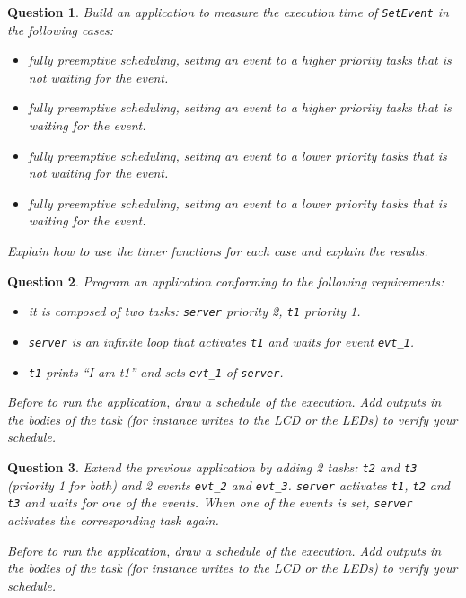 \documentclass[11pt]{report}
\newtheorem{ex}{Question}
\begin{document}
\begin{ex}
    Build an application to measure the execution time of \texttt{SetEvent} in the following cases:
    \begin{itemize}
        \item fully preemptive scheduling, setting an event to a higher priority tasks that is not waiting for the event.
        \item fully preemptive scheduling, setting an event to a higher priority tasks that is waiting for the event.
        \item fully preemptive scheduling, setting an event to a lower priority tasks that is not waiting for the event.
        \item fully preemptive scheduling, setting an event to a lower priority tasks that is waiting for the event.
    \end{itemize}

    Explain how to use the timer functions for each case and explain the results.
\end{ex}

\begin{ex}
Program an application conforming to the following requirements:

\begin{itemize}
    \item it is composed of two tasks: \texttt{server} priority 2, \texttt{t1} priority 1.
    \item \texttt{server} is an infinite loop that activates \texttt{t1} and waits for event \texttt{evt\_1}.
    \item \texttt{t1} prints ``I am t1'' and sets \texttt{evt\_1} of \texttt{server}.
\end{itemize}

Before to run the application, draw a schedule of the execution. Add outputs in the bodies of the task (for instance writes to the LCD or the LEDs) to verify your schedule.
\end{ex}

\begin{ex}
Extend the previous application by adding 2 tasks: \texttt{t2} and \texttt{t3} (priority 1 for both) and 2 events \texttt{evt\_2} and \texttt{evt\_3}. \texttt{server} activates \texttt{t1}, \texttt{t2} and \texttt{t3} and waits for one of the events. When one of the events is set, \texttt{server} activates the corresponding task again.

Before to run the application, draw a schedule of the execution. Add outputs in the bodies of the task (for instance writes to the LCD or the LEDs) to verify your schedule.
\end{ex}
\end{document}
